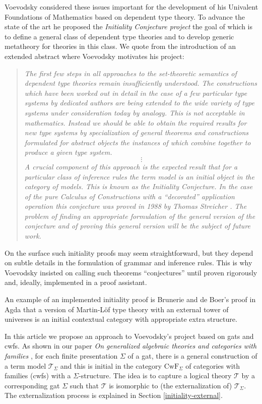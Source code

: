 \documentclass[11pt,a4paper]{article}
\theoremstyle{plain}
\theoremstyle{definition}
\newcommand{\T}{\mathsf{T}}
\def\T{\mathcal{T}}
\def\CwF{\mathrm{CwF}}
\begin{document}
Voevodsky considered these issues important for the development of his Univalent Foundations of Mathematics based on dependent type theory. To advance the state
of the art he proposed the {\em Initiality Conjecture project} the goal of which is to define a general class of dependent type theories and to develop generic metatheory for theories in this class. We quote from the introduction of an extended abstract where Voevodsky \cite{voevodsky:initiality} motivates his project:
\begin{quotation}
\emph{The first few steps in all approaches to the set-theoretic semantics of dependent
type theories remain insuﬃciently understood. The constructions which have been
worked out in detail in the case of a few particular type systems by dedicated authors
are being extended to the wide variety of type systems under consideration today by
analogy. This is not acceptable in mathematics. Instead we should be able to obtain
the required results for new type systems by specialization of general theorems and
constructions formulated for abstract objects the instances of which combine together
to produce a given type system.}
$$
\vdots
$$
\emph{A crucial component of this approach is the expected result that for a particular
class of inference rules the term model is an initial object in the category of models.
This is known as the Initiality Conjecture. In the case of the pure Calculus of
Constructions with a “decorated” application operation this conjecture was proved in
1988 by Thomas Streicher \cite{streicher:thesis}. The problem of finding an appropriate formulation
of the general version of the conjecture and of proving this general version will be the
subject of future work.}
\end{quotation}
On the surface such initiality proofs may seem straightforward, but they depend on subtle details in the formulation of grammar and inference rules. This is why Voevodsky insisted on calling such theorems ``conjectures'' until proven rigorously and, ideally, implemented in a proof assistant.

An example of an implemented initiality proof is Brunerie and de Boer's \cite{Brunerie:initiality,deBoer:lic} proof in Agda that a version of Martin-Löf type theory with an external tower of universes is an initial contextual category \cite{cartmell:phd,cartmell:apal} with appropriate extra structure. %

In this article we propose an approach to Voevodsky's project based on gats and cwfs. As shown in our paper {\em On generalized algebraic theories and categories with families} \cite{bezem:hofmann}, for each finite presentation $\Sigma$ of a gat, there is a general construction of a term model $\T_\Sigma$ and this is initial in the category $\CwF_\Sigma$ of categories with families (cwfs) with a $\Sigma$-structure. The idea is to capture a logical theory $\T$ by a corresponding gat $\Sigma$ such that $\T$ is isomorphic to (the externalization of) $\T_\Sigma$. The externalization process is explained in Section \ref{initiality-external}.
\end{document}
